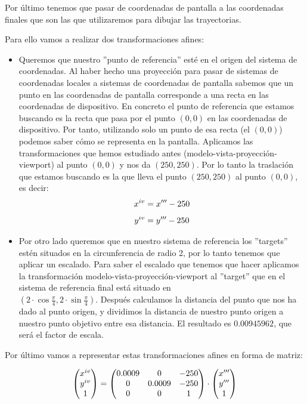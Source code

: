 \documentclass[a4paper,11pt, oneside]{book}
\begin{document}
Por último tenemos que pasar de coordenadas de pantalla a las coordenadas  finales que son las que utilizaremos para dibujar las trayectorias.

Para ello vamos a realizar dos transformaciones afines:
\begin{itemize}
	\item Queremos que nuestro ''punto de referencia'' esté en el origen del sistema de coordenadas. Al haber hecho una proyección para pasar de sistemas de coordenadas locales a sistemas de coordenadas de pantalla sabemos que un punto en las coordenadas de pantalla corresponde a una recta en las coordenadas de dispositivo. En concreto el punto de referencia que estamos buscando es la recta que pasa por el punto $(0,0)$ en las coordenadas de dispositivo. Por tanto, utilizando solo un punto de esa recta (el $(0,0)$) podemos saber cómo se representa en la pantalla. Aplicamos las transformaciones que hemos estudiado antes (modelo-vista-proyección-viewport) al punto $(0,0)$ y nos da $(250,250)$. Por lo tanto la traslación que estamos buscando es la que lleva el punto $(250,250)$ al punto $(0,0)$, es decir:
	\begin{equation}
	x^{\romannumeral 4} = x'''-250
	\end{equation}
	\begin{equation}
	y^{\romannumeral 4} = y'''-250
	\end{equation}
	\item Por otro lado queremos que en nuestro sistema de referencia los ''targets'' estén situados en la circunferencia de radio 2, por lo tanto tenemos que aplicar un escalado. Para saber el escalado que tenemos que hacer aplicamos la transformación modelo-vista-proyección-viewport al ''target'' que en el sistema de referencia final está situado en  \\
	$(2\cdot \cos\frac{\pi}{4},2\cdot \sin\frac{\pi}{4})$. Después calculamos la distancia del punto que nos ha dado al punto origen, y dividimos la distancia de nuestro punto origen a nuestro punto objetivo entre esa distancia. El resultado es $0.00945962$, que será el factor de escala.
\end{itemize}
Por último vamos a representar estas transformaciones afines en forma de matriz:

\begin{equation}
\begin{pmatrix}
x^{\romannumeral 4}\\
y^{\romannumeral 4}\\
1
\end{pmatrix} =
\begin{pmatrix}
0.0009 &0&-250\\
0&0.0009&-250\\
0&0&1 \\
\end{pmatrix}
\cdot \begin{pmatrix}
x'''\\
y'''\\
1
\end{pmatrix}
\end{equation}
\end{document}
